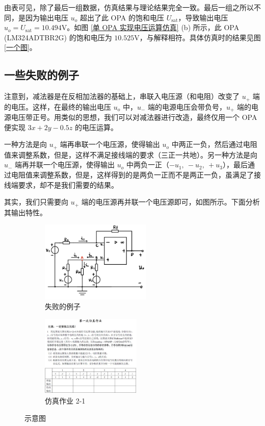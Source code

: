 \documentclass[UTF8]{report}
\theoremstyle{MyLineTheoremStyle} %
\theoremstyle{MyBlockTheoremStyle} %
\theoremstyle{MySubsubsectionStyle} %
\begin{document}
由表可见，除了最后一组数据，仿真结果与理论结果完全一致。最后一组之所以不同，是因为输出电压 $u_o$ 超出了此 OPA 的饱和电压 $U_{\text{sat}}$，导致输出电压 $u_o = U_{\text{sat}} = 10.494 \mathrm{V}$。如图 \ref{单 OPA 实现电压运算仿真} (b) 所示，此 OPA (LM324ADTBR2G) 的饱和电压为 $10.525 \mathrm{V}$，与解释相符。具体仿真时的结果见图 \ref{一个图}。


\subsection{一些失败的例子}
注意到，减法器是在反相加法器的基础上，串联入电压源（和电阻）改变了 $u_+$ 端的电压。这样，在最终的输出电压 $u_o$ 中，$u_-$ 端的电源电压会带负号，$u_+$ 端的电源电压带正号。用类似的思想，我们可以对减法器进行改造，最终仅用一个 OPA 便实现 $3x+2y-0.5z$ 的电压运算。

一种方法是向 $u_+$ 端再串联一个电压源，使得输出 $u_o$ 中两正一负，然后通过电阻值来调整系数，但是，这样不满足接线端的要求（三正一共地）。另一种方法是向 $u_-$ 端再并联一个电压源，使得输出 $u_o$ 中两负一正（$-u_1,\ -u_2,\ +u_3$），最后通过电阻值来调整系数，但是，这样得到的是两负一正而不是两正一负，虽满足了接线端要求，却不是我们需要的结果。

其实，我们只需要向 $u_+$ 端的电压源再并联一个电压源即可，如图所示。下面分析其输出特性。

\begin{figure}[H]\centering
\begin{subfigure}[t]{0.43\textwidth}\centering
    \includegraphics[height=110pt]{assets/3/失败的例子.png}
    \caption{ 失败的例子 }
\end{subfigure}\begin{subfigure}[t]{0.43\textwidth}\centering
    \includegraphics[height=110pt]{assets/3/image (5).jpg}
    \caption{ 仿真作业 2-1 }
\end{subfigure}
\caption{ 示意图 }\label{示意图}
\end{figure}
\end{document}
